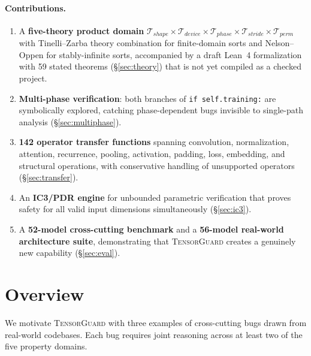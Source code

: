\documentclass[10pt]{article}
\newcommand{\tguard}{\textsc{TensorGuard}}
\newcommand{\Tshape}{\mathcal{T}_{\mathit{shape}}}
\newcommand{\Tdevice}{\mathcal{T}_{\mathit{device}}}
\newcommand{\Tphase}{\mathcal{T}_{\mathit{phase}}}
\newcommand{\Tstride}{\mathcal{T}_{\mathit{stride}}}
\newcommand{\Tperm}{\mathcal{T}_{\mathit{perm}}}
\theoremstyle{plain}
\theoremstyle{definition}
\theoremstyle{remark}
\begin{document}
\paragraph{Contributions.}
\begin{enumerate}[leftmargin=2em]
  \item A \textbf{five-theory product domain}
    $\Tshape \times \Tdevice \times \Tphase \times \Tstride \times
    \Tperm$ with Tinelli--Zarba theory combination for finite-domain
    sorts and Nelson--Oppen for stably-infinite sorts, accompanied by
    a draft Lean~4 formalization with 59 stated theorems
    (\S\ref{sec:theory}) that is not yet compiled as a checked project.

  \item \textbf{Multi-phase verification}: both branches of
    \texttt{if self.training:} are symbolically explored, catching
    phase-dependent bugs invisible to single-path analysis
    (\S\ref{sec:multiphase}).

  \item \textbf{142 operator transfer functions} spanning convolution,
    normalization, attention, recurrence, pooling, activation,
    padding, loss, embedding, and structural operations, with
    conservative handling of unsupported operators
    (\S\ref{sec:transfer}).

  \item An \textbf{IC3/PDR engine} for unbounded parametric
    verification that proves safety for all valid input dimensions
    simultaneously (\S\ref{sec:ic3}).

  \item A \textbf{52-model cross-cutting benchmark} and a
    \textbf{56-model real-world architecture suite}, demonstrating
    that \tguard{} creates a genuinely new capability
    (\S\ref{sec:eval}).
\end{enumerate}


\section{Overview}\label{sec:overview}

We motivate \tguard{} with three examples of cross-cutting bugs drawn
from real-world codebases.  Each bug requires joint reasoning across
at least two of the five property domains.

\end{document}

